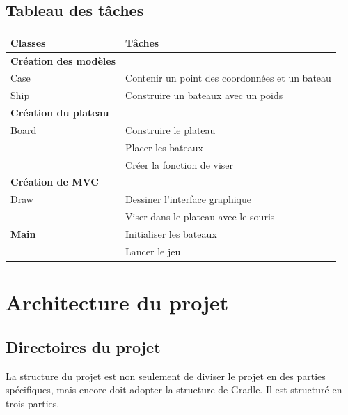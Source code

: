 \documentclass[12pt, pdflatex]{article}
\begin{document}
    \subsection{Tableau des tâches}
    \begin{center}
        \begin{tabular}{|p{5cm}|p{9cm}|}\hline
            \textbf{Classes}& \textbf{Tâches}\\ \hline\hline
            \textbf{Création des modèles}& \\ \hline
            Case&  Contenir un point des coordonnées et un bateau \\ \hline
            Ship&  Construire un bateaux avec un poids    \\ \hline

            \textbf{Création du plateau}& \\\hline
            Board& Construire le plateau \\ &Placer les bateaux \\ &Créer la fonction de viser  \\ \hline

            \textbf{Création de MVC}& \\\hline 
            Draw&  Dessiner l'interface graphique \\ &Viser dans le plateau avec le souris \\ \hline
            
            \textbf{Main} &Initialiser les bateaux\\ &Lancer le jeu\\\hline
            

        \end{tabular}
    \end{center}



\section{Architecture du projet}
    \subsection{Directoires du projet}
    La structure du projet est non seulement de diviser le projet en des parties spécifiques, mais encore doit adopter la structure de Gradle. Il est structuré en trois parties.
\end{document}
